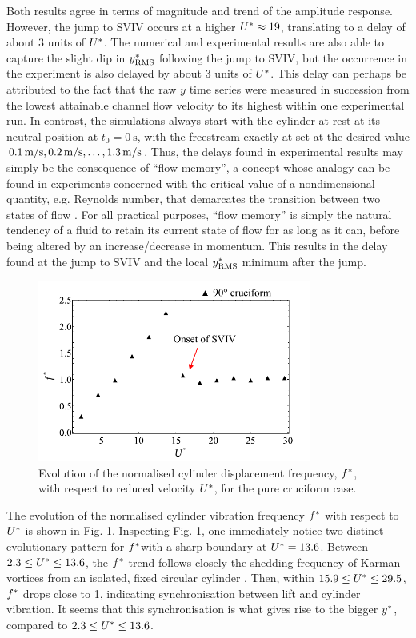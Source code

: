 \documentclass[oneside]{utmthesis}
\begin{document}
\noindent Both results agree in terms of magnitude and trend of the amplitude response. However, the jump to SVIV occurs at a higher $U^{*} \approx 19$, translating to a delay of about 3 units of $U^{*}$. The numerical and experimental results are also able to capture the slight dip in $y^{*}_{\text{RMS}}$ following the jump to SVIV, but the occurrence in the experiment is also delayed by about 3 units of $U^{*}$. This delay can perhaps be attributed to the fact that the raw $y$ time series were measured in succession from the lowest attainable channel flow velocity \uth{} to its highest \uel{} within one experimental run. In contrast, the simulations always start with the cylinder at rest at its neutral position at $t_{0} = \SI{0}{\second}$, with the freestream exactly at set at the desired value $\uon, \utw, \dots, \utt$. Thus, the delays found in experimental results may simply be the consequence of ``flow memory'', a concept whose analogy can be found in experiments concerned with the critical value of a nondimensional quantity, e.g. Reynolds number, that demarcates the transition between two states of flow \citep{Saint-Michel2014,Rahman2015,Li2021}. For all practical purposes, ``flow memory'' is simply the natural tendency of a fluid to retain its current state of flow for as long as it can, before being altered by an increase/decrease in momentum. This results in the delay found at the jump to SVIV and the local $y^{*}_{\text{RMS}}$ minimum after the jump.

\begin{figure}
  \centering
  \includegraphics[width=0.8\textwidth]{figs/yStrFreq5}
  \caption{Evolution of the normalised cylinder displacement frequency, $f^{*}$, with respect to reduced velocity $U^{*}$, for the pure cruciform case.}
  \label{fig:yStrFreq5}
\end{figure}

The evolution of the normalised cylinder vibration frequency $f^{*}$ with respect to $U^{*}$ is shown in Fig. \ref{fig:yStrFreq5}. Inspecting Fig. \ref{fig:yStrFreq5}, one immediately notice two distinct evolutionary pattern for $f^{*}$with a sharp boundary at $U^{*} = 13.6$. Between $2.3 \leq U^{*} \leq 13.6$, the $f^{*}$ trend follows closely the shedding frequency of Karman vortices from an isolated, fixed circular cylinder \citep{Blevins1990}. Then, within $15.9 \leq U^{*} \leq 29.5$, $f^{*}$ drops close to 1, indicating synchronisation between lift and cylinder vibration. It seems that this synchronisation is what gives rise to the bigger $y^{*}$, compared to $2.3 \leq U^{*} \leq 13.6$.
\end{document}

